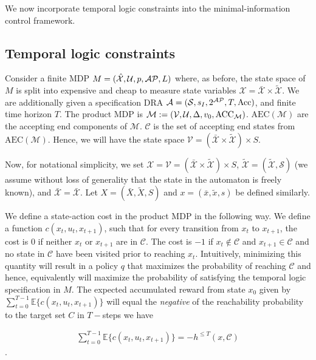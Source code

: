 We now incorporate temporal logic constraints into the minimal-information control framework.
\subsection{Temporal logic constraints}
Consider a finite MDP $M=(\mathcal{\hat{X}},\mathcal{U},p,\mathcal{AP},L)$ where, as before, the state space of $M$ is split into expensive and cheap to measure state variables $\mathcal{X} = \mathcal{\bar{X}} \times \mathcal{\tilde{X}}$. We are additionally given a specification DRA $\mathcal{A} = (\mathcal{S},s_I,2^{\mathcal{AP}}, T,\textrm{Acc})$, and finite time horizon $T$. The product MDP is $\mathcal{M}:= (\mathcal{V},\mathcal{U}, \Delta,v_0,\textrm{ACC}_{\mathcal{M}})$. $\textrm{AEC}(\mathcal{M})$ are the accepting end components of $\mathcal{M}$. $\mathcal{C}$ is the set of accepting end states from $\textrm{AEC}(\mathcal{M})$.  Hence, we will have the state space $\mathcal{V} = (\mathcal{\bar{X}} \times \mathcal{\tilde{X}}) \times S$. 

Now, for notational simplicity, we set $\mathcal{X} = \mathcal{V} = (\mathcal{\bar{X}} \times \mathcal{\tilde{X}}) \times S$, $\mathcal{\tilde{X}} = (\mathcal{\tilde{X}},\mathcal{S})$ (we assume without loss of generality that the state in the automaton is freely known), and $\mathcal{\bar{X}} = \mathcal{\bar{X}}$. Let $X = (\bar{X},\tilde{X},S)$ and $x = (\bar{x},\tilde{x},s)$ be defined similarly.

We define a state-action cost in the product MDP in the following way. We define a function $c(x_t,u_t,x_{t+1})$, such that for every transition from $x_t$ to $x_{t+1}$, the cost is $0$ if neither $x_t$ or $x_{t+1}$ are in $\mathcal{C}$. The cost is $-1$ if $x_t \notin \mathcal{C}$ and $x_{t+1} \in \mathcal{C}$ and no state in $\mathcal{C}$ have been visited prior to reaching $x_t$.  Intuitively, minimizing this quantity will result in a policy $q$ that maximizes the probability of reaching $\mathcal{C}$ and hence, equivalently will maximize the probability of satisfying the temporal logic specification in $M$. The expected accumulated reward from state $x_0$ given by $\sum_{t=0}^{T-1}\mathbb{E}\{c(x_t,u_t,x_{t+1})\}$ will equal the \emph{negative} of the reachability probability to the target set $C$ in $T-$steps \ie we have

\begin{align}\label{eqn:cost}
\sum_{t=0}^{T-1}\mathbb{E}\{c(x_t,u_t,x_{t+1})\} = -h^{\leq T}(x,\mathcal{C})
\end{align}.

